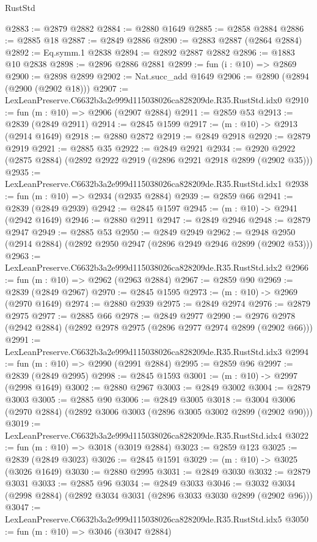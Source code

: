 \begin{lexlean}{RustStd}
\begin{coremodule}
@2883 := @2879 @2882
@2884 := @2880 @1649
@2885 := @2858 @2884
@2886 := @2885 @18
@2887 := @2849 @2886
@2890 := @2883 @2887 (@2864 @2884)
@2892 := Eq.symm.{1} @2838
@2894 := @2892 @2887 @2882
@2896 := @1883 @10 @2838
@2898 := @2896 @2886 @2881
@2899 := fun (i : @10) => @2869
@2900 := @2898 @2899
@2902 := Nat.succ_add @1649
@2906 := @2890 (@2894 (@2900 (@2902 @18)))
@2907 := LexLeanPreserve.C6632b3a2e999d115038026ca828209de.R35.RustStd.idx0
@2910 := fun (m : @10) => @2906 (@2907 @2884)
@2911 := @2859 @53
@2913 := @2839 (@2849 @2911)
@2914 := @2845 @1599
@2917 := (m : @10) -> @2913 (@2914 @1649)
@2918 := @2880 @2872
@2919 := @2849 @2918
@2920 := @2879 @2919
@2921 := @2885 @35
@2922 := @2849 @2921
@2934 := @2920 @2922 (@2875 @2884) (@2892 @2922 @2919 (@2896 @2921 @2918 @2899 (@2902 @35)))
@2935 := LexLeanPreserve.C6632b3a2e999d115038026ca828209de.R35.RustStd.idx1
@2938 := fun (m : @10) => @2934 (@2935 @2884)
@2939 := @2859 @66
@2941 := @2839 (@2849 @2939)
@2942 := @2845 @1597
@2945 := (m : @10) -> @2941 (@2942 @1649)
@2946 := @2880 @2911
@2947 := @2849 @2946
@2948 := @2879 @2947
@2949 := @2885 @53
@2950 := @2849 @2949
@2962 := @2948 @2950 (@2914 @2884) (@2892 @2950 @2947 (@2896 @2949 @2946 @2899 (@2902 @53)))
@2963 := LexLeanPreserve.C6632b3a2e999d115038026ca828209de.R35.RustStd.idx2
@2966 := fun (m : @10) => @2962 (@2963 @2884)
@2967 := @2859 @90
@2969 := @2839 (@2849 @2967)
@2970 := @2845 @1595
@2973 := (m : @10) -> @2969 (@2970 @1649)
@2974 := @2880 @2939
@2975 := @2849 @2974
@2976 := @2879 @2975
@2977 := @2885 @66
@2978 := @2849 @2977
@2990 := @2976 @2978 (@2942 @2884) (@2892 @2978 @2975 (@2896 @2977 @2974 @2899 (@2902 @66)))
@2991 := LexLeanPreserve.C6632b3a2e999d115038026ca828209de.R35.RustStd.idx3
@2994 := fun (m : @10) => @2990 (@2991 @2884)
@2995 := @2859 @96
@2997 := @2839 (@2849 @2995)
@2998 := @2845 @1593
@3001 := (m : @10) -> @2997 (@2998 @1649)
@3002 := @2880 @2967
@3003 := @2849 @3002
@3004 := @2879 @3003
@3005 := @2885 @90
@3006 := @2849 @3005
@3018 := @3004 @3006 (@2970 @2884) (@2892 @3006 @3003 (@2896 @3005 @3002 @2899 (@2902 @90)))
@3019 := LexLeanPreserve.C6632b3a2e999d115038026ca828209de.R35.RustStd.idx4
@3022 := fun (m : @10) => @3018 (@3019 @2884)
@3023 := @2859 @123
@3025 := @2839 (@2849 @3023)
@3026 := @2845 @1591
@3029 := (m : @10) -> @3025 (@3026 @1649)
@3030 := @2880 @2995
@3031 := @2849 @3030
@3032 := @2879 @3031
@3033 := @2885 @96
@3034 := @2849 @3033
@3046 := @3032 @3034 (@2998 @2884) (@2892 @3034 @3031 (@2896 @3033 @3030 @2899 (@2902 @96)))
@3047 := LexLeanPreserve.C6632b3a2e999d115038026ca828209de.R35.RustStd.idx5
@3050 := fun (m : @10) => @3046 (@3047 @2884)

\end{coremodule}
\end{lexlean}

